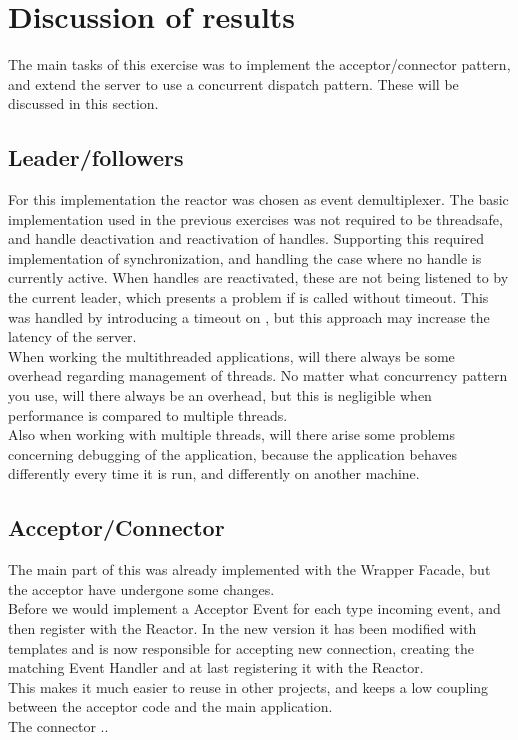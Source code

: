\documentclass[Main]{subfiles}
\begin{document}
\chapter{Discussion of results}

The main tasks of this exercise was to implement the acceptor/connector pattern, and extend the server to use a concurrent dispatch pattern. These will be discussed in this section.

\section*{Leader/followers}

For this implementation the reactor was chosen as event demultiplexer. The basic implementation used in the previous exercises was not required to be threadsafe, and handle deactivation and reactivation of handles. Supporting this required implementation of synchronization, and handling the case where no handle is currently active. When handles are reactivated, these are not being listened to by the current leader, which presents a problem if  is called without timeout. This was handled by introducing a timeout on , but this approach may increase the latency of the server.\\
When working the multithreaded applications, will there always be some overhead regarding management of threads.
No matter what concurrency pattern you use, will there always be an overhead, but this is negligible when performance is compared to multiple threads.\\
Also when working with multiple threads, will there arise some problems concerning debugging of the application, because the application behaves differently every time it is run, and differently on another machine.

\section*{Acceptor/Connector}
The main part of this was already implemented with the Wrapper Facade, but the acceptor have undergone some changes.\\
Before we would implement a Acceptor Event for each type incoming event, and then register with the Reactor.
In the new version it has been modified with templates and is now responsible for accepting new connection, creating the matching Event Handler and at last registering it with the Reactor.\\
This makes it much easier to reuse in other projects, and keeps a low coupling between the acceptor code and the main application.\\
The connector ..
\end{document}
